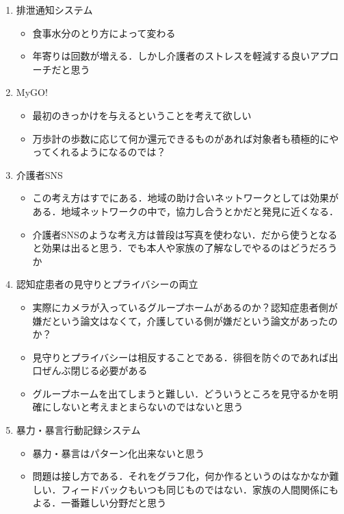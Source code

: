 \documentclass[../report]{subfiles}
\begin{document}
\begin{enumerate}
    \item[] 排泄通知システム
\begin{itemize}
    \item 食事水分のとり方によって変わる
    \item 年寄りは回数が増える．しかし介護者のストレスを軽減する良いアプローチだと思う
\end{itemize}

    \item[] MyGO!
\begin{itemize}
    \item 最初のきっかけを与えるということを考えて欲しい
    \item 万歩計の歩数に応じて何か還元できるものがあれば対象者も積極的にやってくれるようになるのでは？
\end{itemize}

    \item[] 介護者SNS
\begin{itemize}
    \item この考え方はすでにある．地域の助け合いネットワークとしては効果がある．地域ネットワークの中で，協力し合うとかだと発見に近くなる．
    \item 介護者SNSのような考え方は普段は写真を使わない．だから使うとなると効果は出ると思う．でも本人や家族の了解なしでやるのはどうだろうか
\end{itemize}

    \item[] 認知症患者の見守りとプライバシーの両立
\begin{itemize}
    \item 実際にカメラが入っているグループホームがあるのか？認知症患者側が嫌だという論文はなくて，介護している側が嫌だという論文があったのか？
    \item 見守りとプライバシーは相反することである．徘徊を防ぐのであれば出口ぜんぶ閉じる必要がある
    \item グループホームを出てしまうと難しい．どういうところを見守るかを明確にしないと考えまとまらないのではないと思う
\end{itemize}

    \item[] 暴力・暴言行動記録システム
\begin{itemize}
    \item 暴力・暴言はパターン化出来ないと思う
    \item 問題は接し方である．それをグラフ化，何か作るというのはなかなか難しい．フィードバックもいつも同じものではない．家族の人間関係にもよる．一番難しい分野だと思う
\end{itemize}
\end{enumerate}
\end{document}
